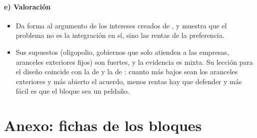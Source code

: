 \documentclass[11pt]{article}
\begin{document}
\paragraph{e) Valoración}

\begin{itemize}
\item Da forma al argumento de los intereses creados de , y muestra que el problema no es la integración en sí, sino las rentas de la preferencia.
\item Sus supuestos (oligopolio, gobiernos que solo atienden a las empresas, aranceles exteriores fijos) son fuertes, y la evidencia es mixta. Su lección para el diseño coincide con la de  y la de : cuanto más bajos sean los aranceles exteriores y más abierto el acuerdo, menos rentas hay que defender y más fácil es que el bloque sea un peldaño.
\end{itemize}

\section{Anexo: fichas de los bloques}\label{anexo:fichas}
\end{document}
